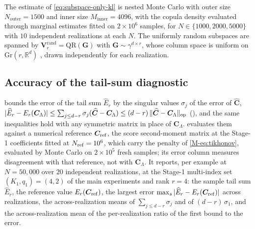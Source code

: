 \documentclass[supplement,review,hidelinks,onefignum,onetabnum]{siamart251216}
\newcommand{\RR}{\mathbb{R}}
\newcommand{\gauss}{\gamma}
\newcommand{\mC}{\bm{C}}
\newcommand{\hmC}{\widehat{\bm{C}}}
\newcommand{\mV}{\bm{V}}
\newcommand{\mG}{\bm{G}}
\newcommand{\Gr}{\mathrm{Gr}}
\begin{document}
The estimate of \eqref{eq:subspace-only-kl} is nested Monte Carlo with outer size $N_{\mathrm{outer}} = 1500$ and inner size $M_{\mathrm{inner}} = 4096$, with the copula density evaluated through marginal estimates fitted on $2\times10^6$ samples, for $N \in \{1000, 2000, 5000\}$ with $10$ independent realizations at each $N$. The uniformly random subspaces are spanned by $\mV_r^{\mathrm{rand}} = \mathrm{QR}(\mG)$ with $\mG \sim \gauss^{d\times r}$, whose column space is uniform on $\Gr(r,\RR^d)$ \cite{Mezzadri2007}, drawn independently for each realization.

\subsection*{Accuracy of the tail-sum diagnostic}
\label{sec:ehat-tightness}

 bounds the error of the tail sum $\widehat E_r$ by the singular values $\sigma_j$ of the error of $\hmC$, $|\widehat E_r - E_r(\mC_\Lambda)| \le \sum_{j\le d-r}\sigma_j(\hmC - \mC_\Lambda) \le (d-r)\,\|\hmC - \mC_\Lambda\|_{\rm op}$ (), and the same inequalities hold with any symmetric matrix in place of $\mC_\Lambda$.  evaluates them against a numerical reference $\mC_{\rm ref}$, the score second-moment matrix at the Stage-1 coefficients fitted at $N_{\rm ref} = 10^6$, which carry the penalty of \eqref{M-eq:tikhonov}, evaluated by Monte Carlo on $2\times10^5$ fresh samples; its error column measures disagreement with that reference, not with $\mC_\Lambda$. It reports, per example at $N = 50{,}000$ over $20$ independent realizations, at the Stage-1 multi-index set $(K_1, q_1) = (4, 2)$ of the main experiments and rank $r = 4$: the sample tail sum $\widehat E_r$, the reference value $E_r(\mC_{\rm ref})$, the largest error $\max_s |\widehat E_r - E_r(\mC_{\rm ref})|$ across realizations, the across-realization means of $\sum_{j\le d-r}\sigma_j$ and of $(d-r)\,\sigma_1$, and the across-realization mean of the per-realization ratio of the first bound to the error.
\end{document}

